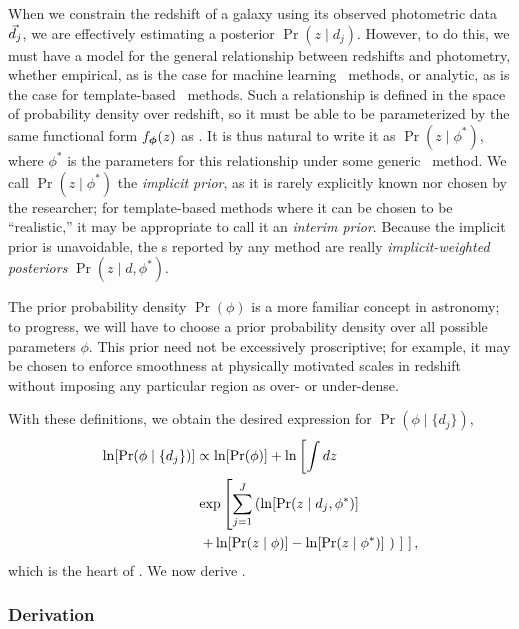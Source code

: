 When we constrain the redshift of a galaxy using its observed photometric data $\vec{d}_{j}$, we are effectively estimating a posterior $\Pr(z \mid d_{j})$.
However, to do this, we must have a model for the general relationship between redshifts and photometry, whether empirical, as is the case for machine learning \pzpdf\ methods, or analytic, as is the case for template-based \pzpdf\ methods.
Such a relationship is defined in the space of probability density over redshift, so it must be able to be parameterized by the same functional form $f_{{\boldsymbol{\phi}}}(z)$ as \nz .
It is thus natural to write it as $\Pr(z \mid \phi^{*})$, where $\phi^{*}$ is the parameters for this relationship under some generic \pzpdf\ method.
We call $\Pr(z \mid \phi^{*})$ the \textit{implicit prior}, as it is rarely explicitly known nor chosen by the researcher; for template-based methods where it can be chosen to be ``realistic,'' it may be appropriate to call it an \textit{interim prior}.
Because the implicit prior is unavoidable, the \pzpdf s reported by any method are really \textit{implicit-weighted posteriors} $\Pr(z \mid d, \phi^{*})$.

The prior probability density $\Pr(\phi)$ is a more familiar concept in astronomy; to progress, we will have to choose a prior probability density over all possible parameters $\phi$.
This prior need not be excessively proscriptive; for example, it may be chosen to enforce smoothness at physically motivated scales in redshift without imposing any particular region as over- or under-dense.

With these definitions, we obtain the desired expression for $\Pr(\phi \mid \{d_{j}\})$,
\begin{align}
\begin{split}
\eqlabel{eqn:fullpost}
\ln[\Pr(\phi \mid \{d_{j}\})] & \propto \ln[\Pr(\phi)] + \ln \left[\int dz \right.\\
& \left. \exp \left[\sum_{j=1}^{J} \left(\ln[\Pr(z \mid d_{j}, \phi^{*})] \right. \right. \right.\\
& \left. \left. \left. + \ln[\Pr(z \mid \phi)] - \ln[\Pr(z \mid \phi^{*})]\ \right)\ \right]\ \right] ,
\end{split}
\end{align}
which is the heart of \chippr.
We now derive .

\subsubsection{Derivation}

